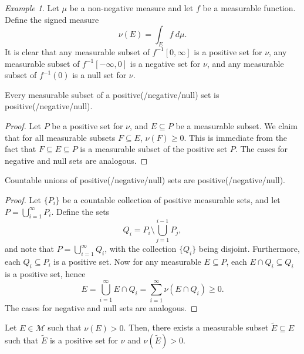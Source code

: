 \documentclass[11pt]{article}
\newcommand{\M}{\mathcal{M}}
\theoremstyle{definition}
\theoremstyle{remark}
\newtheorem*{example}{Example}
\begin{document}
    \begin{example}
        Let $\mu$ be a non-negative measure and let $f$ be a measurable function.
        Define the signed measure \[
            \nu(E) = \int_E f\:d\mu.
        \] It is clear that any measurable subset of $f^{-1}[0, \infty]$ is a
        positive set for $\nu$, any measurable subset of $f^{-1}[-\infty, 0]$ is a
        negative set for $\nu$, and any measurable subset of $f^{-1}(0)$ is a null
        set for $\nu$.
    \end{example}

    \begin{lemma}
        Every measurable subset of a positive(/negative/null) set is
        positive(/negative/null).
    \end{lemma}
    \begin{proof}
        Let $P$ be a positive set for $\nu$, and $E \subseteq P$ be a measurable
        subset. We claim that for all measurable subsets $F \subseteq E$, $\nu(F)
        \geq 0$. This is immediate from the fact that $F \subseteq E \subseteq P$ is
        a measurable subset of the positive set $P$. The cases for negative and null
        sets are analogous.
    \end{proof}

    \begin{lemma}
        Countable unions of positive(/negative/null) sets are
        positive(/negative/null).
    \end{lemma}
    \begin{proof}
        Let $\{P_i\}$ be a countable collection of positive measurable sets, and let
        $P = \bigcup_{i = 1}^\infty P_i$. Define the sets \[
            Q_i = P_i \setminus \bigcup_{j = 1}^{i - 1} P_j,
        \] and note that $P = \bigcup_{i = 1}^\infty Q_i$, with the collection
        $\{Q_i\}$ being disjoint. Furthermore, each $Q_i \subseteq P_i$ is a positive
        set. Now for any measurable $E \subseteq P$, each $E \cap Q_i \subseteq Q_i$
        is a positive set, hence \[
            E = \bigcup_{i = 1}^\infty E \cap Q_i = \sum_{i = 1}^\infty \nu(E \cap
            Q_i) \geq 0.
        \] The cases for negative and null sets are analogous.
    \end{proof}

    \begin{lemma}
        Let $E \in \M$ such that $\nu(E) > 0$. Then, there exists a measurable subset
        $\tilde{E} \subseteq E$ such that $\tilde{E}$ is a positive set for $\nu$
        and $\nu(\tilde{E}) > 0$.
    \end{lemma}
\end{document}
